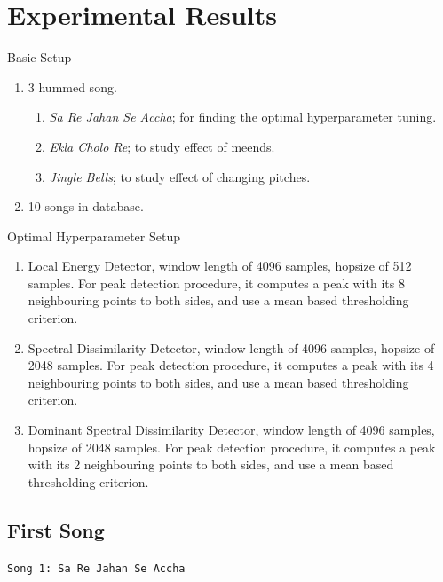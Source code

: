 \documentclass[10pt]{beamer}
\begin{document}
\section{Experimental Results}

\begin{frame}{Basic Setup}
    \begin{enumerate}
        \item 3 hummed song. 
        \begin{enumerate}
            \item \textit{Sa Re Jahan Se Accha}; for finding the optimal hyperparameter tuning.
            \item \textit{Ekla Cholo Re}; to study effect of meends.
            \item \textit{Jingle Bells}; to study effect of changing pitches.
        \end{enumerate}
        \item 10 songs in database.
    \end{enumerate}
\end{frame}

\begin{frame}{Optimal Hyperparameter Setup}
    \begin{enumerate}
        \item  Local Energy Detector, window length of 4096 samples, hopsize of 512 samples. For peak
        detection procedure, it computes a peak with its 8 neighbouring points to both sides, and use a mean based
        thresholding criterion.
        \item  Spectral Dissimilarity Detector, window length of 4096 samples, hopsize of 2048 samples. For peak detection procedure, it computes a peak with its 4 neighbouring points to both sides, and use a mean based thresholding criterion.
        \item Dominant Spectral Dissimilarity Detector, window length of 4096 samples, hopsize of 2048 samples. For peak detection procedure, it computes a peak with its 2 neighbouring points to both sides, and use a mean based thresholding criterion.
    \end{enumerate}    
\end{frame}

\subsection{First Song}
{
\begin{frame}[standout]
  \texttt{Song 1: Sa Re Jahan Se Accha}
\end{frame}
}
\end{document}
